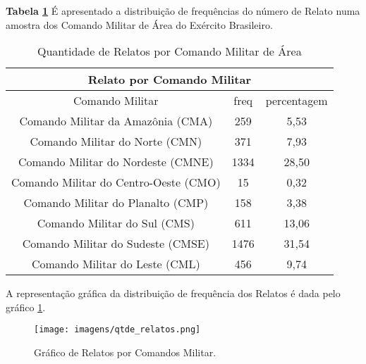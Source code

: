 \hspace{1.5cm}
\textbf{Tabela \ref{QuantidadeRelatos}} É apresentado a distribuição de frequências do número de Relato numa amostra dos Comando Militar de Área do Exército Brasileiro. 
\begin{table}[H]
\centering
\begin{tabular}{|c | c| c|} 
 \multicolumn{3}{c}{Relato por Comando Militar}\\ \hline
  Comando Militar & freq  & percentagem  \\ [0.5ex] 
 \hline
 Comando Militar da Amazônia (CMA) &  259 & 5,53\\ 
 \hline
 Comando Militar do Norte (CMN) &  371 & 7,93\\
 \hline
 Comando Militar do Nordeste (CMNE) &  1334 & 28,50\\
 \hline
 Comando Militar do Centro-Oeste (CMO) &  15 & 0,32\\
 \hline
 Comando Militar do Planalto (CMP) &  158 & 3,38\\
 \hline
 Comando Militar do Sul (CMS) &  611 & 13,06\\
 \hline
 Comando Militar do Sudeste (CMSE) &  1476 & 31,54\\
 \hline
 Comando Militar do Leste (CML) &  456 & 9,74\\ [1ex] 
 \hline
\end{tabular}
\caption{Quantidade de Relatos por Comando Militar de Área}
\label{QuantidadeRelatos}
\end{table}

\hspace{1.5cm}
A representação gráfica da distribuição de frequência dos Relatos é dada pelo gráfico \ref{figuraRelatos}.
\begin{figure}[H]
        \centering
        \texttt{[image: imagens/qtde\_relatos.png]}
        \caption{Gráfico de Relatos por Comandos Militar.}
        \label{figuraRelatos}
\end{figure}

